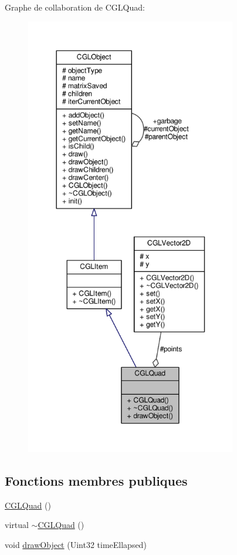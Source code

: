 Graphe de collaboration de C\-G\-L\-Quad\-:\nopagebreak
\begin{figure}[H]
\begin{center}
\leavevmode
\includegraphics[height=550pt]{dd/d46/class_c_g_l_quad__coll__graph}
\end{center}
\end{figure}
\subsection*{Fonctions membres publiques}
\begin{DoxyCompactItemize}
\item 
\hyperlink{class_c_g_l_quad_a95b07c1605f65de30cb47b65fa364294}{C\-G\-L\-Quad} ()
\item 
virtual \hyperlink{class_c_g_l_quad_a19320cf64816de2de1fa7540acbf833e}{$\sim$\-C\-G\-L\-Quad} ()
\item 
void \hyperlink{class_c_g_l_quad_a81696d558e2355af7d621cdbf0ccf41a}{draw\-Object} (Uint32 time\-Ellapsed)
\end{DoxyCompactItemize}
